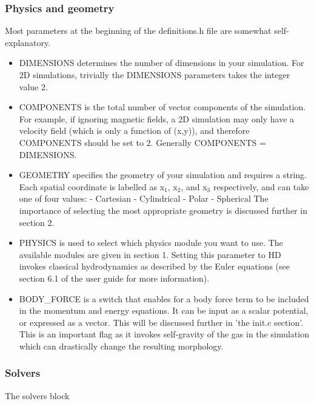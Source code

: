 \documentclass[12pt,a4paper]{report}
\begin{document}
\subsubsection{Physics and geometry}
Most parameters at the beginning of the definitions.h file are somewhat self-explanatory. 
\begin{itemize}
\item DIMENSIONS  determines the number of dimensions in your simulation. For 2D simulations, trivially the DIMENSIONS parameters takes the integer value 2. 

\item COMPONENTS is the total number of vector components of the simulation. For example, if ignoring magnetic fields, a 2D simulation may only have a velocity field (which is only a function of (x,y)), and therefore COMPONENTS should be set to 2. Generally COMPONENTS = DIMENSIONS.

\item GEOMETRY specifies the geometry of your simulation and requires a string. Each spatial coordinate is labelled as x$_1$, x$_2$, and x$_3$ respectively, and can take one of four values:
\subitem - Cartesian
\subitem - Cylindrical
\subitem - Polar
\subitem - Spherical
The importance of selecting the most appropriate geometry is discussed further in section 2.

\item PHYSICS is used to select which physics module you want to use. The available modules are given in section 1. Setting this parameter to HD invokes classical hydrodynamics as described by the Euler equations (see section 6.1 of the user guide for more information).

\item BODY\_FORCE is a switch that enables for a body force term to be included in the momentum and energy equations. It can be input as a scalar potential, or expressed as a vector. This will be discussed further in 'the init.c section'. This is an important flag as it invokes self-gravity of the gas in the simulation which can drastically change the resulting morphology.
\end{itemize}

\subsubsection{Solvers}
The solvers block 
\end{document}
